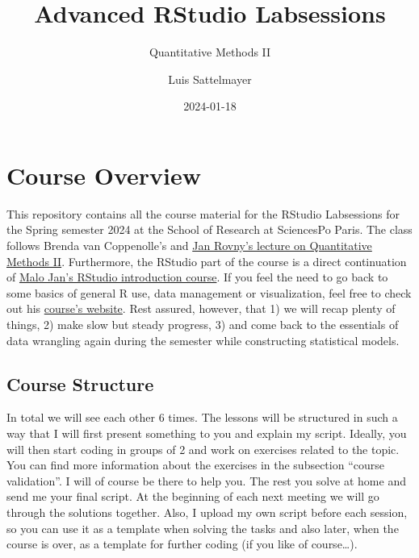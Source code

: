 \documentclass[
  letterpaper,
  DIV=11,
  numbers=noendperiod]{scrreprt}
\title{Advanced RStudio Labsessions}
\subtitle{Quantitative Methods II}
\author{Luis Sattelmayer}
\date{2024-01-18}
\renewcommand*\contentsname{Table of contents}
\newcommand\contentsname{Table of contents}
\begin{document}
\maketitle
\ifdefined\Shaded\renewenvironment{Shaded}{\begin{tcolorbox}[interior hidden, breakable, frame hidden, borderline west={3pt}{0pt}{shadecolor}, enhanced, sharp corners, boxrule=0pt]}{\end{tcolorbox}}\fi

\renewcommand*\contentsname{Table of contents}
{
\hypersetup{linkcolor=}
\setcounter{tocdepth}{2}
\tableofcontents
}

\hypertarget{course-overview}{%
\chapter*{Course Overview}\label{course-overview}}


This repository contains all the course material for the RStudio
Labsessions for the Spring semester 2024 at the School of Research at
SciencesPo Paris. The class follows Brenda van Coppenolle's and
\href{https://www.rovny.org/methods-2-ed}{Jan Rovny's lecture on
Quantitative Methods II}. Furthermore, the RStudio part of the course is
a direct continuation of
\href{https://github.com/malojan/intro_r?tab=readme-ov-file}{Malo Jan's
RStudio introduction course}. If you feel the need to go back to some
basics of general R use, data management or visualization, feel free to
check out his
\href{https://malo-jn.quarto.pub/introduction-to-r/}{course's website}.
Rest assured, however, that 1) we will recap plenty of things, 2) make
slow but steady progress, 3) and come back to the essentials of data
wrangling again during the semester while constructing statistical
models.

\hypertarget{course-structure}{%
\section*{Course Structure}\label{course-structure}}


In total we will see each other 6 times. The lessons will be structured
in such a way that I will first present something to you and explain my
script. Ideally, you will then start coding in groups of 2 and work on
exercises related to the topic. You can find more information about the
exercises in the subsection ``course validation''. I will of course be
there to help you. The rest you solve at home and send me your final
script. At the beginning of each next meeting we will go through the
solutions together. Also, I upload my own script before each session, so
you can use it as a template when solving the tasks and also later, when
the course is over, as a template for further coding (if you like of
course\ldots).
\end{document}
